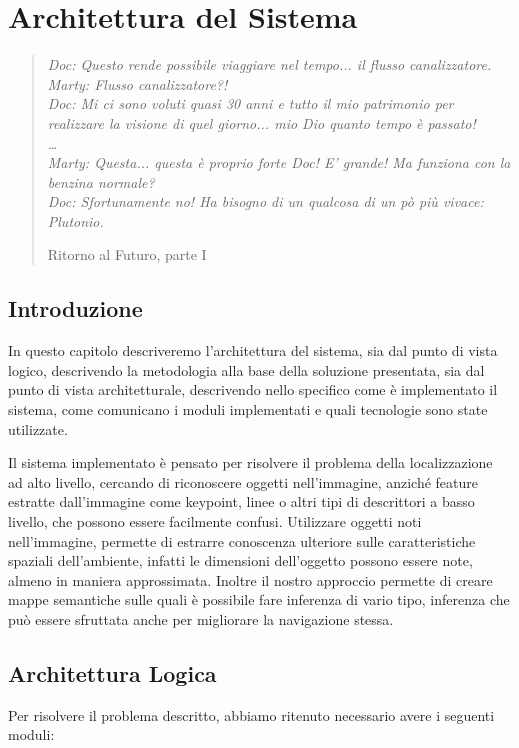 \chapter{Architettura del Sistema}
\label{cap:architettura}
\thispagestyle{empty}

\begin{quotation}
{\footnotesize
\noindent \emph{Doc: Questo rende possibile viaggiare nel tempo... il flusso canalizzatore.
Marty: Flusso canalizzatore?! \\
Doc: Mi ci sono voluti quasi 30 anni e tutto il mio patrimonio per realizzare la visione di quel giorno... mio Dio quanto tempo è passato! \\
\dots \\
Marty: Questa... questa è proprio forte Doc! E' grande! Ma funziona con la benzina normale? \\
Doc: Sfortunamente no! Ha bisogno di un qualcosa di un pò più vivace: Plutonio.
}
\begin{flushright}
Ritorno al Futuro, parte I
\end{flushright}
}
\end{quotation}
\vspace{0.5cm}

\section{Introduzione}
In questo capitolo descriveremo l'architettura del sistema, sia dal punto di vista logico, descrivendo la metodologia alla base della soluzione presentata, sia dal punto di vista architetturale, descrivendo nello specifico come è implementato il sistema, come comunicano i moduli implementati e quali tecnologie sono state utilizzate.

Il sistema implementato è pensato per risolvere il problema della localizzazione ad alto livello, cercando di riconoscere oggetti nell'immagine, anziché feature estratte dall'immagine come keypoint, linee o altri tipi di descrittori a basso livello, che possono essere facilmente confusi. Utilizzare oggetti noti nell'immagine, permette di estrarre conoscenza ulteriore sulle caratteristiche spaziali dell'ambiente, infatti le dimensioni dell'oggetto possono essere note, almeno in maniera approssimata. Inoltre il nostro approccio permette di creare mappe semantiche sulle quali è possibile fare inferenza di vario tipo, inferenza che può essere sfruttata anche per migliorare la navigazione stessa.

\section{Architettura Logica}
Per risolvere il problema descritto, abbiamo ritenuto necessario avere i seguenti moduli:

